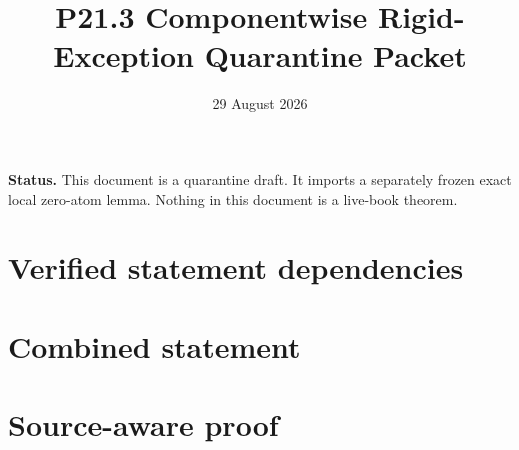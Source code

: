\documentclass[11pt]{article}
\title{P21.3 Componentwise Rigid-Exception Quarantine Packet}
\author{}
\date{29 August 2026}
\theoremstyle{remark}
\begin{document}
\maketitle

\noindent\textbf{Status.}
This document is a quarantine draft.  It imports a separately frozen exact
local zero-atom lemma.  Nothing in this document is a live-book theorem.

\section*{Verified statement dependencies}







\section*{Combined statement}



\section*{Source-aware proof}





\end{document}
